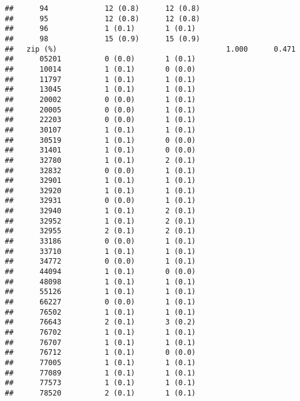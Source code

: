 \documentclass[]{article}
\begin{document}
\begin{verbatim}
##      94             12 (0.8)      12 (0.8)                      
##      95             12 (0.8)      12 (0.8)                      
##      96             1 (0.1)       1 (0.1)                       
##      98             15 (0.9)      15 (0.9)                      
##   zip (%)                                       1.000      0.471
##      05201          0 (0.0)       1 (0.1)                       
##      10014          1 (0.1)       0 (0.0)                       
##      11797          1 (0.1)       1 (0.1)                       
##      13045          1 (0.1)       1 (0.1)                       
##      20002          0 (0.0)       1 (0.1)                       
##      20005          0 (0.0)       1 (0.1)                       
##      22203          0 (0.0)       1 (0.1)                       
##      30107          1 (0.1)       1 (0.1)                       
##      30519          1 (0.1)       0 (0.0)                       
##      31401          1 (0.1)       0 (0.0)                       
##      32780          1 (0.1)       2 (0.1)                       
##      32832          0 (0.0)       1 (0.1)                       
##      32901          1 (0.1)       1 (0.1)                       
##      32920          1 (0.1)       1 (0.1)                       
##      32931          0 (0.0)       1 (0.1)                       
##      32940          1 (0.1)       2 (0.1)                       
##      32952          1 (0.1)       2 (0.1)                       
##      32955          2 (0.1)       2 (0.1)                       
##      33186          0 (0.0)       1 (0.1)                       
##      33710          1 (0.1)       1 (0.1)                       
##      34772          0 (0.0)       1 (0.1)                       
##      44094          1 (0.1)       0 (0.0)                       
##      48098          1 (0.1)       1 (0.1)                       
##      55126          1 (0.1)       1 (0.1)                       
##      66227          0 (0.0)       1 (0.1)                       
##      76502          1 (0.1)       1 (0.1)                       
##      76643          2 (0.1)       3 (0.2)                       
##      76702          1 (0.1)       1 (0.1)                       
##      76707          1 (0.1)       1 (0.1)                       
##      76712          1 (0.1)       0 (0.0)                       
##      77005          1 (0.1)       1 (0.1)                       
##      77089          1 (0.1)       1 (0.1)                       
##      77573          1 (0.1)       1 (0.1)                       
##      78520          2 (0.1)       1 (0.1)                       

\end{verbatim}
\end{document}
